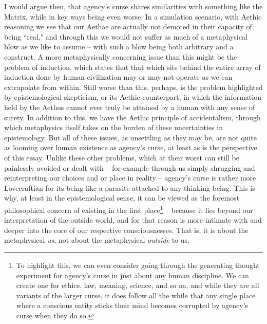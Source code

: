I would argue then, that agency's curse shares similarities with something like the Matrix, while in key ways being even worse. In a simulation scenario, with Aethic reasoning \cite{Aethus} we see that our Aethae are actually not demoted in their capacity of being ``real," and through this we would not suffer as much of a metaphysical blow as we like to assume -- with such a blow being both arbitrary and a construct. A more metaphysically concerning issue than this might be the problem of induction, which states that that which sits behind the entire array of induction done by human civilization may or may not operate as we can extrapolate from within. Still worse than this, perhaps, is the problem highlighted by epistemological skepticism, or its Aethic counterpart, in which the information held by the Aethus cannot ever truly be attained by a human with any sense of surety. In addition to this, we have the Aethic principle of accidentalism, through which metaphysics itself takes on the burden of these uncertainties in epistemology. But all of these issues, as unsettling as they may be, are not quite as looming over human existence as agency's curse, at least as is the perspective of this essay. Unlike these other problems, which at their worst can still be painlessly avoided or dealt with -- for example through us simply shrugging and reinterpreting our choices and or place in reality -- agency's curse is rather more Lovecraftian for its being like a parasite attached to any thinking being. This is why, at least in the epistemological sense, it can be viewed as the foremost philosophical concern of existing in the first place\footnote{To highlight this, we can even consider going through the generating thought experiment for agency's curse in just about any human discipline. We can create one for ethics, law, meaning, science, and so on, and while they are all variants of the larger curse, it does follow all the while that any single place where a conscious entity sticks their mind becomes corrupted by agency's curse when they do so.} -- because it lies beyond our interpretation of the outside world, and for that reason is more intimate with and deeper into the core of our respective consciousnesses. That is, it is about the metaphysical \textit{us}, not about the metaphysical \textit{outside} to us. 

